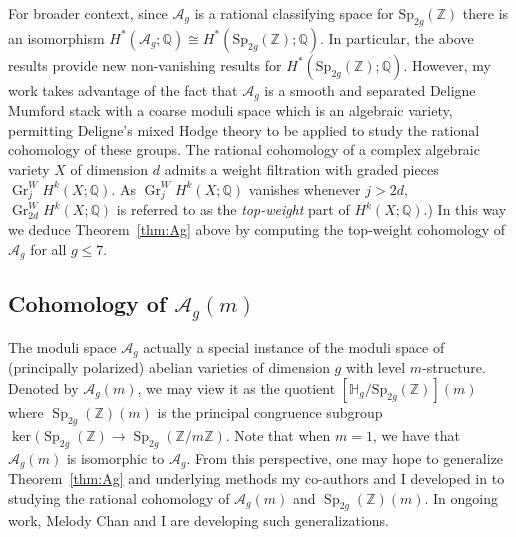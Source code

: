 \documentclass[11pt,reqno]{amsart}
\theoremstyle{remark}
\newcommand{\Gr}{\operatorname{Gr}}
\newcommand{\Sp}{\operatorname{Sp}}
\newcommand{\cA}{\mathcal{A}}
\newcommand{\cM}{\mathcal{M}}
\newcommand{\Q}{\mathbb{Q}}
\newcommand{\Z}{\mathbb{Z}}
\begin{document}
For broader context, since $\cA_g$ is a rational classifying space for $\mathrm{Sp}_{2g}(\Z)$ there is an isomorphism $H^*(\cA_g;\Q) \cong H^*(\mathrm{Sp}_{2g}(\Z);\Q)$. In particular, the above results provide new non-vanishing results for $H^*(\mathrm{Sp}_{2g}(\Z);\Q)$. However, my work takes advantage of the fact that $\cA_g$  is a smooth and separated Deligne Mumford stack with a coarse moduli space which is an algebraic variety, permitting Deligne's mixed Hodge theory to be applied to study the rational cohomology of these groups. The rational cohomology of a %
complex algebraic variety $X$ of dimension $d$ admits a weight filtration with graded pieces $\Gr_{j}^W\!H^k(X;\mathbb{Q})$. %
As $\Gr_{j}^W\!H^k(X;\mathbb{Q})$ vanishes whenever $j>2d$, $\Gr_{2d}^W\!H^k(X;\mathbb{Q})$ is referred to as the {\em top-weight} part of $H^k(X;\Q)$.)  In this way we deduce Theorem~\ref{thm:Ag} above by computing the top-weight cohomology of $\cA_{g}$ for all $g\leq 7$.  







\subsection{Cohomology of $\cA_{g}(m)$}

The moduli space $\cA_{g}$ actually a special instance of the moduli space of (principally polarized) abelian varieties of dimension $g$ with level $m$-structure. Denoted by $\cA_{g}(m)$, we may view it as the quotient $[\mathbb{H}_g/\mathrm{Sp}_{2g}(\Z)](m)$  where $\Sp_{2g}(\Z)(m)$ is the principal congruence subgroup $\ker(\Sp_{2g}(\Z) \to \Sp_{2g}(\Z/m\Z)$. Note that when $m=1$, we have that $\cA_{g}(m)$ is isomorphic to $\cA_{g}$. From this perspective, one may hope to generalize Theorem~\ref{thm:Ag} and underlying methods my co-authors and I developed in \cite{BBCMMW22} to studying the rational cohomology of  $\cA_{g}(m)$ and $\Sp_{2g}(\Z)(m)$. In ongoing work, Melody Chan and I are developing such generalizations.
\end{document}
